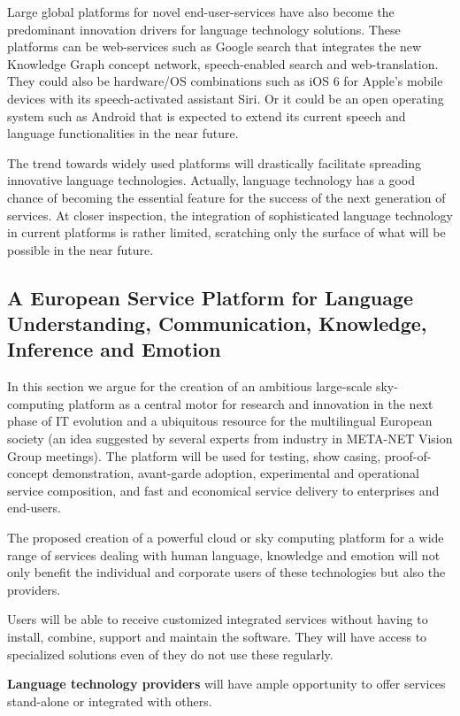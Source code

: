 \documentclass[10pt, plain]{../../metanetpaper}
\begin{document}
\begin{multicols}{2}
Large global platforms for novel end-user-services have also become the predominant innovation drivers for language technology solutions. These platforms can be web-services such as Google search that integrates the new Knowledge Graph concept network, speech-enabled search and web-translation. They could also be hardware/OS combinations such as iOS 6 for Apple’s mobile devices with its speech-activated assistant Siri. Or it could be an open operating system such as Android that is expected to extend its current speech and language functionalities in the near future.

The trend towards widely used platforms will drastically facilitate spreading innovative language technologies. Actually, language technology has a good chance of becoming the essential feature for the success of the next generation of services. At closer inspection, the integration of sophisticated language technology in current platforms is rather limited, scratching only the surface of what will be possible in the near future.

\subsection{A European Service Platform for Language Understanding, Communication, Knowledge, Inference and Emotion}
\label{sec:europ-service-platform}

In this section we argue for the creation of an ambitious large-scale sky-computing platform as a central motor for research and innovation in the next phase of IT evolution and a ubiquitous resource for the multilingual European society (an idea suggested by several experts from industry in META-NET Vision Group meetings). The platform will be used for testing, show casing, proof-of-concept demonstration, avant-garde adoption, experimental and operational service composition, and fast and economical service delivery to enterprises and end-users.
 
The proposed creation of a powerful cloud or sky computing platform for a wide range of services dealing with human language, knowledge and emotion will not only benefit the individual and corporate users of these technologies but also the providers.
 
Users will be able to receive customized integrated services without having to install, combine, support and maintain the software. They will have access to specialized solutions even of they do not use these regularly. 
 
\textbf{Language technology providers} will have ample opportunity to offer services stand-alone or integrated with others.
 

\end{multicols}
\end{document}
